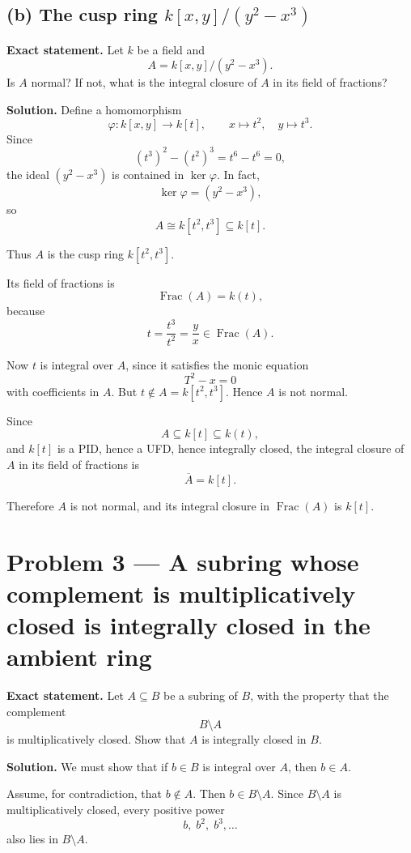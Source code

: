\documentclass[12pt,a4paper]{article}
\theoremstyle{plain}
\theoremstyle{definition}      %
\begin{document}
\subsection*{(b) The cusp ring \texorpdfstring{$k[x,y]/(y^2-x^3)$}{k[x,y]/(y\string^2-x\string^3)}}

\textbf{Exact statement.}
Let \(k\) be a field and
\[
A=k[x,y]/(y^2-x^3).
\]
Is \(A\) normal? If not, what is the integral closure of \(A\) in its field of fractions?

\textbf{Solution.}
Define a homomorphism
\[
\varphi:k[x,y]\to k[t],\qquad x\mapsto t^2,\quad y\mapsto t^3.
\]
Since
\[
(t^3)^2-(t^2)^3=t^6-t^6=0,
\]
the ideal \((y^2-x^3)\) is contained in \(\ker\varphi\). In fact,
\[
\ker\varphi=(y^2-x^3),
\]
so
\[
A\cong k[t^2,t^3]\subseteq k[t].
\]

Thus \(A\) is the cusp ring \(k[t^2,t^3]\).

Its field of fractions is
\[
\operatorname{Frac}(A)=k(t),
\]
because
\[
t=\frac{t^3}{t^2}=\frac{y}{x}\in \operatorname{Frac}(A).
\]

Now \(t\) is integral over \(A\), since it satisfies the monic equation
\[
T^2-x=0
\]
with coefficients in \(A\). But \(t\notin A=k[t^2,t^3]\). Hence \(A\) is not normal.

Since
\[
A\subseteq k[t]\subseteq k(t),
\]
and \(k[t]\) is a PID, hence a UFD, hence integrally closed, the integral closure of \(A\) in its field of fractions is
\[
\overline{A}=k[t].
\]

Therefore \(A\) is not normal, and its integral closure in \(\operatorname{Frac}(A)\) is \(k[t]\).	


\section*{Problem 3 --- A subring whose complement is multiplicatively closed is integrally closed in the ambient ring}

\textbf{Exact statement.}
Let \(A\subseteq B\) be a subring of \(B\), with the property that the complement
\[
B\setminus A
\]
is multiplicatively closed. Show that \(A\) is integrally closed in \(B\).

\textbf{Solution.}
We must show that if \(b\in B\) is integral over \(A\), then \(b\in A\).

Assume, for contradiction, that \(b\notin A\). Then \(b\in B\setminus A\). Since \(B\setminus A\) is multiplicatively closed, every positive power
\[
b,\;b^2,\;b^3,\dots
\]
also lies in \(B\setminus A\).
\end{document}
